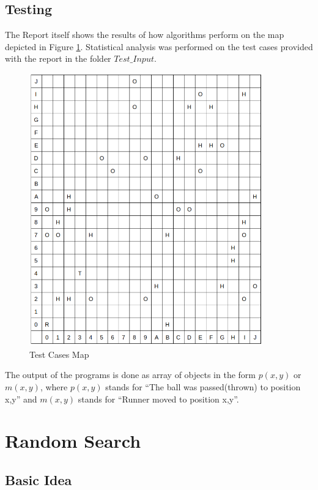 \documentclass[a4apper,11pt]{article}
\begin{document}
\subsection{Testing}
The Report itself shows the results of how algorithms perform on the map depicted in Figure \ref{pic:TCMap}. Statistical analysis was performed on the test cases provided with the report in the folder $Test\_Input$.

\begin{figure}[h]
    \centering
    \includegraphics[width=0.9\textwidth]{pic/TestMap.png}
    \caption{Test Cases Map}
    \label{pic:TCMap}
\end{figure}

The output of the programs is done as array of objects in the form $p(x,y)$ or $m(x,y)$,  where $p(x,y)$ stands for ``The ball was passed(thrown) to position x,y'' and $m(x,y)$ stands for ``Runner moved to position x,y''.

\newpage
\section{Random Search}
\subsection{Basic Idea}
\end{document}
